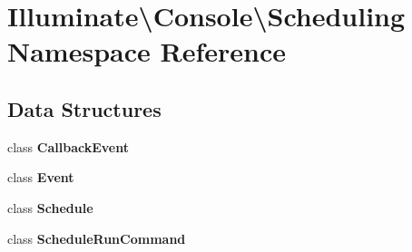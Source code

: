 \section{Illuminate\textbackslash{}Console\textbackslash{}Scheduling Namespace Reference}
\label{namespace_illuminate_1_1_console_1_1_scheduling}
\subsection*{Data Structures}
\begin{DoxyCompactItemize}
\item 
class {\bf Callback\+Event}
\item 
class {\bf Event}
\item 
class {\bf Schedule}
\item 
class {\bf Schedule\+Run\+Command}
\end{DoxyCompactItemize}
